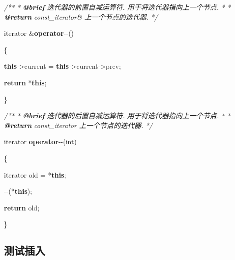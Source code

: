 \documentclass[
]{article}
\newenvironment{Shaded}{}{}
\newcommand{\AnnotationTok}[1]{\textcolor[rgb]{0.38,0.63,0.69}{\textbf{\textit{#1}}}}
\newcommand{\CommentTok}[1]{\textcolor[rgb]{0.38,0.63,0.69}{\textit{#1}}}
\newcommand{\ControlFlowTok}[1]{\textcolor[rgb]{0.00,0.44,0.13}{\textbf{#1}}}
\newcommand{\DataTypeTok}[1]{\textcolor[rgb]{0.56,0.13,0.00}{#1}}
\newcommand{\KeywordTok}[1]{\textcolor[rgb]{0.00,0.44,0.13}{\textbf{#1}}}
\newcommand{\NormalTok}[1]{#1}
\newcommand{\OperatorTok}[1]{\textcolor[rgb]{0.40,0.40,0.40}{#1}}
\begin{document}
\begin{Shaded}
\begin{Highlighting}[]
\CommentTok{/**
}
\CommentTok{ * }\AnnotationTok{@brief}\CommentTok{ 迭代器的前置自减运算符. 用于将迭代器指向上一个节点.
}
\CommentTok{ *
}
\CommentTok{ * }\AnnotationTok{@return}\CommentTok{ const\_iterator\& 上一个节点的迭代器.
}
\CommentTok{ */}

\NormalTok{iterator }\OperatorTok{\&}\KeywordTok{operator}\OperatorTok{{-}{-}()}

\OperatorTok{\{}

    \KeywordTok{this}\OperatorTok{{-}\textgreater{}}\NormalTok{current }\OperatorTok{=} \KeywordTok{this}\OperatorTok{{-}\textgreater{}}\NormalTok{current}\OperatorTok{{-}\textgreater{}}\NormalTok{prev}\OperatorTok{;}

    \ControlFlowTok{return} \OperatorTok{*}\KeywordTok{this}\OperatorTok{;}

\OperatorTok{\}}



\CommentTok{/**
}
\CommentTok{ * }\AnnotationTok{@brief}\CommentTok{ 迭代器的后置自减运算符. 用于将迭代器指向上一个节点.
}
\CommentTok{ *
}
\CommentTok{ * }\AnnotationTok{@return}\CommentTok{ const\_iterator 上一个节点的迭代器.
}
\CommentTok{ */}

\NormalTok{iterator }\KeywordTok{operator}\OperatorTok{{-}{-}(}\DataTypeTok{int}\OperatorTok{)}

\OperatorTok{\{}

\NormalTok{    iterator old }\OperatorTok{=} \OperatorTok{*}\KeywordTok{this}\OperatorTok{;}

    \OperatorTok{{-}{-}(*}\KeywordTok{this}\OperatorTok{);}

    \ControlFlowTok{return}\NormalTok{ old}\OperatorTok{;}

\OperatorTok{\}}
\end{Highlighting}
\end{Shaded}

\hypertarget{ux6d4bux8bd5ux63d2ux5165}{%
\subsection{测试插入}\label{ux6d4bux8bd5ux63d2ux5165}}
\end{document}
